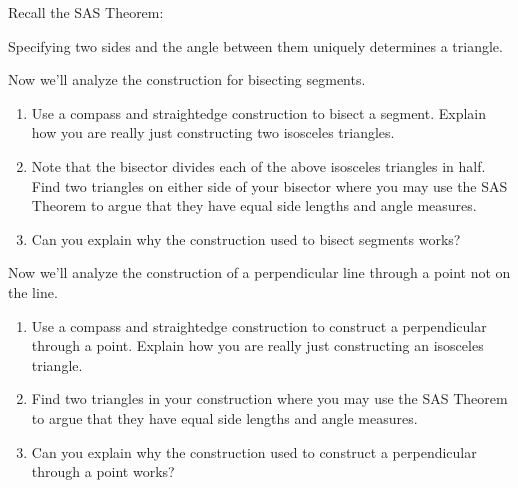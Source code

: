 Recall the SAS Theorem:

\begin{theorem}[SAS] 
Specifying two sides and the angle between them uniquely determines a
triangle.
\end{theorem}


\begin{prob} Now we'll analyze the construction for bisecting segments.
\begin{enumerate} 
\item Use a compass and straightedge construction to bisect a
  segment. Explain how you are really just constructing two
  isosceles triangles.
\item Note that the bisector divides each of the above isosceles
  triangles in half. Find two triangles on either side of your
  bisector where you may use the SAS Theorem to argue that they have
  equal side lengths and angle measures.
\item Can you explain why the construction used to bisect segments
  works?
\end{enumerate}
\end{prob}




\begin{prob} 
Now we'll analyze the construction of a perpendicular line through a
point not on the line.
\begin{enumerate}
\item Use a compass and straightedge construction to construct a
  perpendicular through a point. Explain how you are really just
  constructing an isosceles triangle.
\item Find two triangles in your construction where you may use the
  SAS Theorem to argue that they have equal side lengths and angle
  measures.
\item Can you explain why the construction used to construct a
  perpendicular through a point works?
\end{enumerate}
\end{prob}

